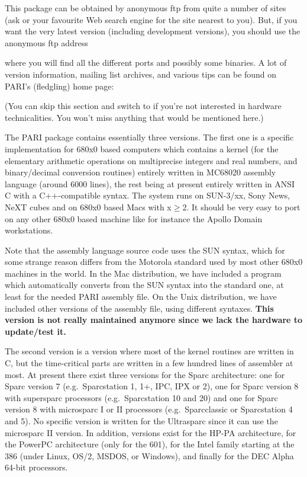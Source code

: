 
\noindent
This package can be obtained by anonymous ftp from quite a number of sites
(ask  or your favourite Web search engine for the site nearest to
you). But, if you want the very latest version (including development
versions), you should use the anonymous ftp address


\noindent
where you will find all the different ports and possibly some
binaries. A lot of version information, mailing list archives, and various
tips can be found on PARI's (fledgling) home page:

\kbd{\wwwsite}

 (You can skip this section and switch to
 if you're not interested in hardware technicalities. You
won't miss anything that would be mentioned here.)

The PARI package contains essentially three versions. The first one is a
specific implementation for 680x0 based computers which contains a kernel
(for the elementary arithmetic operations on multiprecise integers and real
numbers, and binary/decimal conversion routines) entirely written in
MC68020 assembly language (around 6000 lines), the rest being at present
entirely written in ANSI C with a C++-compatible syntax. The system runs on
SUN-3/xx, Sony News, NeXT cubes and on 680x0 based Macs with x$\ge$2. It
should be very easy to port on any other 680x0 based machine like for
instance the Apollo Domain workstations.

Note that the assembly language source code uses the SUN syntax, which for
some strange reason differs from the Motorola standard used by most other
680x0 machines in the world. In the Mac distribution, we have included a
program which automatically converts from the SUN syntax into the standard
one, at least for the needed PARI assembly file. On the Unix distribution,
we have included other versions of the assembly file, using different
syntaxes. {\bf This version is not really maintained anymore since we lack
the hardware to update/test it.}

The second version is a version where most of the kernel routines are written
in C, but the time-critical parts are written in a few hundred lines
of assembler at most. At present there exist three versions for the Sparc
architecture: one for Sparc version 7 (e.g.~Sparcstation 1, 1+, IPC, IPX or 2),
one for Sparc version 8 with supersparc processors (e.g.~Sparcstation 10
and 20) and one for Sparc version 8 with microsparc I or II processors
(e.g.~Sparcclassic or Sparcstation 4 and 5). No specific version is written
for the Ultrasparc since it can use the microsparc II version. In addition,
versions exist for the HP-PA architecture, for the PowerPC architecture
(only for the 601), for the Intel family starting at the 386 (under Linux,
OS/2, MSDOS, or Windows), and finally for the DEC Alpha 64-bit processors.

